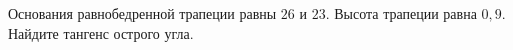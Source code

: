 \begin{ex}
	\begin{condition}
		 Основания равнобедренной трапеции равны \( 26  \) и \( 23 \). Высота трапеции равна \( 0,9 \). Найдите тангенс острого угла.
	\end{condition}
\end{ex}